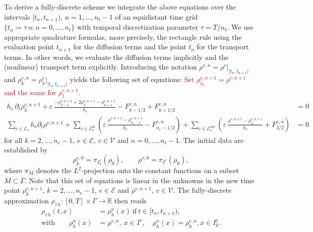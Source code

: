 To derive a fully-discrete scheme we integrate the above equations over the intervals $[t_n,t_{n+1})$, $n=1,\ldots,n_t-1$ of an equidistant time grid $\{t_n\coloneqq \tau\,n\colon n=0,\ldots,n_t\}$ with temporal discretization parameter $\tau = T/n_t$. We use appropriate quadrature formulas, more precisely, the rectangle rule using the evaluation point $t_{n+1}$ for the diffusion terms and the point $t_n$ for the transport terms. In other words, we evaluate the diffusion terms implicitly and the (nonlinear) transport term explicitly. Introducing the notation $\rho^{v,n} = \rho^v|_{[t_n,t_{n+1})}$ and $\rho_k^{e,n} = \rho_k^e|_{[t_n,t_{n+1})}$ yields the following set of equations: \textcolor{red}{Set $\rho^{e,n+1}_{n_e} = \rho^{v,n+1}$ and the same for $\rho^{e,n+1}_1$.}
\begin{subequations}
    \label{eq:fully_discrete_fvm}
    \begin{align}
        h_e\,\partial_t \rho_k^{e,n+1} + \varepsilon\,\frac{-\rho_{k-1}^{e,n+1} +
        2\rho_k^{e,n+1} - \rho_{k+1}^{e,n+1}}{h_e} - F_{k-1/2}^{e,n} +
        F_{k+1/2}^{e,n} &= 0 \\	
        \sum_{e\in \mathcal{E}_v} h_e\partial_t\rho^{v,n+1}
        + \sum_{e\in \mathcal{E}_v^{\text{in}}}
        \left(\varepsilon\,\frac{\rho^{v,n+1}-\rho_{n_e-1}^{e,n+1}}{h_e} -
        F^{e,n}_{n_e-1/2}\right)
        + \sum_{e\in \mathcal{E}_v^{\text{out}}}
        \left(\varepsilon\,\frac{\rho^{v,n+1}-\rho_2^{e,n+1}}{h_e} + F^{e,n}_{3/2}\right)
        &= 0
    \end{align}
\end{subequations}
for all $k=2,\ldots,n_e-1,\ e\in \mathcal{E}$, $v\in \mathcal{V}$ and $n=0,\ldots,n_t-1$. The initial data are established by
\begin{equation*}
	\rho_k^{e,0}=\pi_{I_k^e}(\rho_0),\qquad \rho^{v,0} = \pi_{I^v}(\rho_0),
\end{equation*}
where $\pi_M$ denotes the $L^2$-projection onto the constant functions on a subset $M\subset \Gamma$. Note that this set of equations is linear in the unknowns in the new time point $\rho_k^{e,n+1}$, $k=2,\ldots,n_e-1$, $e\in \mathcal{E}$ and $\rho^{v,n+1}$, $v\in \mathcal{V}$. The fully-discrete approximation $\rho_{\tau\,h}\colon [0,T]\times \Gamma\to \mathbb{R}$ then reads
\begin{align*}
	\rho_{\tau\,h}(t,x) &= \rho_h^n(x)\ \text{if}\ t\in [t_n,t_{n+1}),\\
	\text{with}\qquad \rho_h^n(x) &= \rho^{v,n},\ x\in I^v,\quad \rho_h^n(x)
	= \rho_k^{e,n}, x\in I_k^e.
\end{align*}

